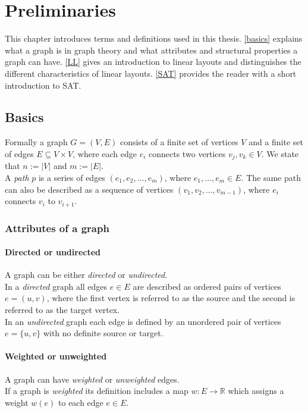 \chapter{Preliminaries}
  \label{PR}
This chapter introduces terms and definitions used in this thesis. \autoref{basics} explains what a graph is in graph theory and what attributes and structural properties a graph can have.
\autoref{LL} gives an introduction to linear layouts and distinguishes the different characteristics of linear layouts.
\autoref{SAT} provides the reader with a short introduction to SAT. 
\section{Basics}
\label{basics}
Formally a graph $G = (V, E)$ consists of a finite set of vertices $V$ and a finite set of edges $E \subseteq V \times V$, where each edge $e_i$ connects two vertices $v_j, v_k \in V$. We state that $n := |V|$ and $m := |E|$.\\
A \textit{path} $p$ is a series of edges $(e_1, e_2,...,e_m)$, where $e_1,...,e_m \in E$. The same path can also be described as a sequence of vertices $(v_1,v_2,...,v_{m-1})$, where  $e_i$ connects $v_i$ to $v_{i+1}$.
\subsection{Attributes of a graph}
\subsubsection{Directed or undirected}
A graph can be either \textit{directed} or \textit{undirected}.\\
In a \textit{directed} graph all edges $e \in E$ are described as ordered pairs of vertices $e = (u,v)$, where the first vertex is referred to as the source and the second is referred to as the target vertex.\\
In an \textit{undirected} graph each edge is defined by an unordered pair of vertices $e = \{u,v\}$ with no definite source or target. 
\subsubsection{Weighted or unweighted}
A graph can have \textit{weighted}  or \textit{unweighted} edges.\\
If a graph is \textit{weighted} its definition includes a map $w: E \rightarrow \mathbb{R}$ which assigns a weight $w(e)$ to each edge $e \in E$. 
